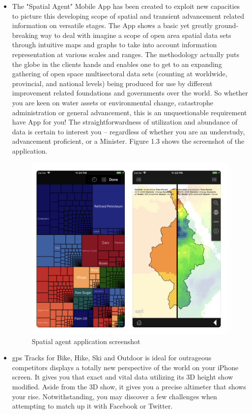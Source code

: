 \begin{itemize}
  
  \item The "Spatial Agent" Mobile App has been created to exploit new capacities to picture this developing scope of spatial and transient advancement related information on versatile stages. The App shows a basic yet greatly ground-breaking way to deal with imagine a scope of open area spatial data sets through intuitive maps and graphs to take into account information representation at various scales and ranges. The methodology actually puts the globe in the clients hands and enables one to get to an expanding gathering of open space multisectoral data sets (counting at worldwide, provincial, and national levels) being produced for use by different improvement related foundations and governments over the world. So whether you are keen on water assets or environmental change, catastrophe administration or general advancement, this is an unquestionable requirement have App for you! The straightforwardness of utilization and abundance of data is certain to interest you – regardless of whether you are an understudy, advancement proficient, or a Minister. Figure 1.3 shows the screenshot of the application. \cite{Spatial_Agent}
  
  
  
  \begin{figure}[H]
            \centering
            \includegraphics[width=0.5\linewidth]{figures/ch1/spatial_agent.png}
            \caption{\label{fig:spatial_agent} Spatial agent application screenshot \cite{Spatial_Agent}}
    \end{figure}
  
  \item \gls{gps} Tracks for Bike, Hike, Ski and Outdoor is ideal for outrageous competitors displays a totally new perspective of the world on your iPhone screen. It gives you that exact and vital data utilizing its 3D height show modified. Aside from the 3D show, it gives you a precise altimeter that shows your rise. Notwithstanding, you may discover a few challenges when attempting to match up it with Facebook or Twitter.
  

\end{itemize}
